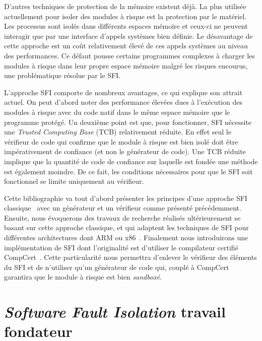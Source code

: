 \documentclass[11pt]{sdm}
\begin{document}
D'autres techniques de protection de la mémoire existent déjà. La plus utilisée actuellement pour isoler des modules à risque est la protection par le matériel. Les processus sont isolés dans différents espaces mémoire et ceux-ci ne peuvent interagir que par une interface d'appels systèmes bien définie. Le désavantage de cette approche est un coût relativement élevé de ces appels systèmes au niveau des performances. Ce défaut pousse certains programmes complexes à charger les modules à risque dans leur propre espace mémoire malgré les risques encourus, une problématique résolue par le SFI.

L'approche SFI comporte de nombreux avantages, ce qui explique son attrait actuel. On peut d'abord noter des performance élevées dues à l'exécution des modules à risque avec du code natif dans le même espace mémoire que le programme protégé. Un deuxième point est que, pour fonctionner, SFI nécessite une \textit{Trusted Computing Base} (TCB) relativement réduite. En effet seul le vérifieur de code qui confirme que le module à risque est bien isolé doit être impérativement de confiance (et non le générateur de code). Une TCB réduite implique que la quantité de code de confiance sur laquelle est fondée une méthode est également moindre. De ce fait, les conditions nécessaires pour que le SFI soit fonctionnel se limite uniquement au vérifieur.

Cette bibliographie va tout d'abord présenter les principes d'une approche SFI classique~\cite{Wahbe:1993:ESF:173668.168635} avec un générateur et un vérifieur comme présenté précédemment. Ensuite, nous évoquerons des travaux de recherche réalisés ultérieurement se basant sur cette approche classique, et qui adaptent les techniques de SFI pour différentes architectures dont ARM ou x86~\cite{Sehr:2010:ASF:1929820.1929822}. Finalement nous introduirons une implémentation de SFI dont l'originalité est d'utiliser le compilateur certifié CompCert~\cite{Leroy:2009:FVR:1538788.1538814}\cite{Kroll:2014:PSF:2708449.2708686}. Cette particularité nous permettra d'enlever le vérifieur des éléments du SFI et de n'utiliser qu'un générateur de code qui, couplé à CompCert garantira que le module à risque est bien \textit{sandboxé}.


\section{\textit{Software Fault Isolation} travail fondateur}
\end{document}

